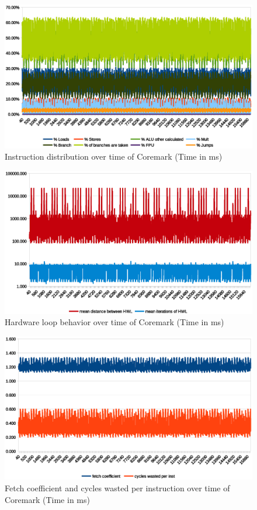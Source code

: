 \documentclass[../bachelor_paper.tex]{subfiles}
\begin{document}
\begin{figure}
    \centering
    \includegraphics[width=\textwidth]{img/graph/coremark/coremark_inst.eps}
    \caption{Instruction distribution over time of Coremark (Time in ms)}
    \label{fig:res/coremark/inst}
\end{figure}

\begin{figure}
    \centering
    \includegraphics[width=\textwidth]{img/graph/coremark/coremark_hwl.eps}
    \caption{Hardware loop behavior over time of Coremark (Time in ms)}
    \label{fig:res/coremark/hwl}
\end{figure}

\begin{figure}
    \centering
    \includegraphics[width=\textwidth]{img/graph/coremark/coremark_fetch_waste.eps}
    \caption{Fetch coefficient and cycles wasted per instruction over time of Coremark (Time in ms)}
    \label{fig:res/coremark/fetch_waste}
\end{figure}
\end{document}

